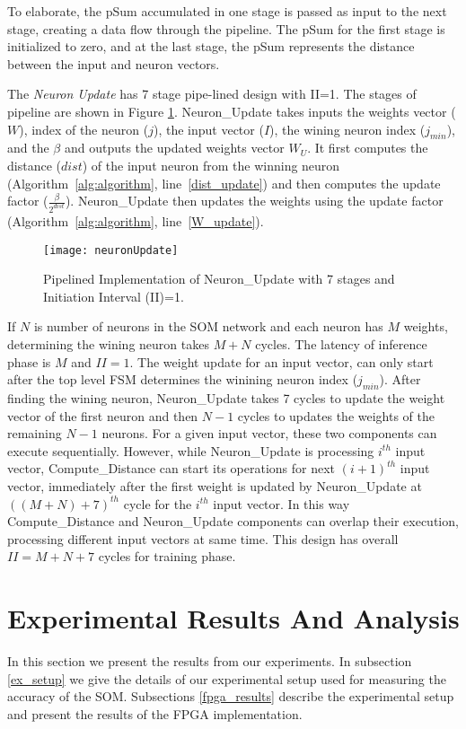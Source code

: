 To elaborate, the pSum accumulated in one stage is passed as input to the next stage, creating a data flow through the pipeline. The pSum for the first stage is initialized to zero, and at the last stage, the pSum represents the distance between the input and neuron vectors.

The \textit{Neuron Update} has 7 stage pipe-lined design with II=1. The stages of pipeline are shown in Figure \ref{fig:NeuronUpdate}. Neuron\_Update takes inputs the weights vector ($W$), index of the neuron ($j$), the input vector ($I$), the wining neuron index ($j_{min}$), and the $\beta$ and outputs the updated weights vector $W_U$. 
It first computes the distance ($dist$) of the input neuron from the winning neuron (Algorithm~\ref{alg:algorithm}, line~\ref{dist_update}) and then computes the update factor ($\frac{\beta}{2^{dist}}$). Neuron\_Update then updates the weights using the update factor (Algorithm~\ref{alg:algorithm}, line~\ref{W_update}). 
\begin{figure}[!htb]
	\centering
	\texttt{[image: neuronUpdate]}
	\caption{Pipelined Implementation of Neuron\_Update with 7 stages and Initiation Interval (II)=1.}
	\label{fig:NeuronUpdate}
\end{figure}

If $N$ is number of neurons in the SOM network and each neuron has $M$ weights, determining the wining neuron takes $M{+}N$ cycles. The latency of inference phase is $M$ and $II{=}1$. The weight update for an input vector, can only start after the top level FSM determines the winining neuron index ($j_{min}$). After finding the wining neuron, Neuron\_Update takes 7 cycles to update the weight vector of the first neuron and then $N{-}1$ cycles to updates the weights of the remaining $N{-}1$ neurons. For a given input vector, these two components can execute sequentially. However, while Neuron\_Update is processing $i^{th}$ input vector, Compute\_Distance can start its operations for next $(i{+}1)^{th}$ input vector, immediately after the first weight is updated by Neuron\_Update at $((M{+}N){+}7)^{th}$ cycle for the $i^{th}$ input vector. In this way Compute\_Distance and Neuron\_Update components can overlap their execution, processing different input vectors at same time. This design has overall $II{=}M{+}N{+}7$ cycles for training phase.

\section{Experimental Results And Analysis}\label{sec:results}
In this section we present the results from our experiments. In subsection \ref{ex_setup} we give the details of our experimental setup used for measuring the accuracy of the SOM. Subsections \ref{fpga_results} describe the experimental setup and present the results of the FPGA implementation.
